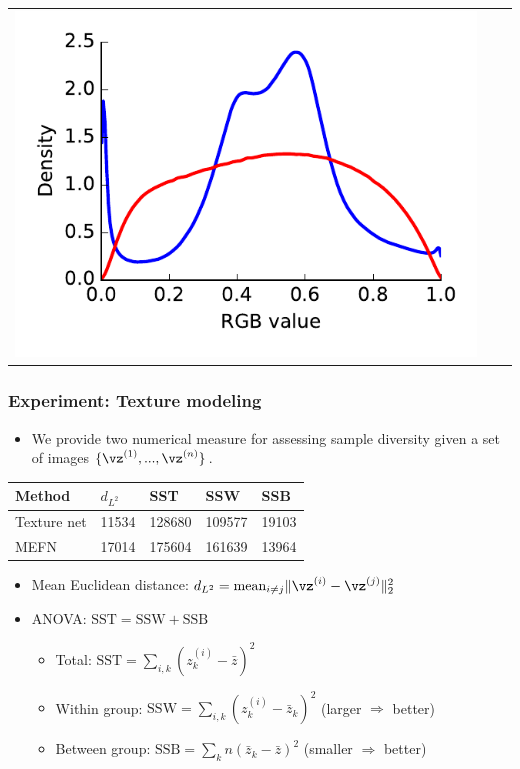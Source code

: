 \documentclass[16pt,presentation]{beamer}
\begin{document}
\begin{frame}
{\begin{tabular}[t]{ccc}
\hspace{-0.3cm}\includegraphics[scale=0.33,clip = true]{figs/MEFN/fig_texture_RGB_hist.pdf} \\
\end{tabular}
}
\end{frame}


\begin{frame}
\frametitle{Experiment: Texture modeling}
\begin{itemize}
\item We provide two numerical measure for assessing sample diversity given a set of images $\{\vz^{(1)},...,\vz^{(n)}\}$.
\end{itemize}
\centering
\begin{table}[htpb]
\begin{center}
\begin{tabular}{l | l | lll}
Method  & $d_{L^2}$& SST & SSW & SSB \\
\hline 
Texture net  & 11534 & 128680 & 109577 & 19103\\
MEFN   & 17014 & 175604 & 161639 & 13964 \\
\end{tabular}
\end{center}
\begin{itemize}
\item Mean Euclidean distance: $d_{L^2} = \text{mean}_{i \neq j} \|\vz^{(i)} - \vz^{(j)} \|_2^2$
\item ANOVA: $\text{SST} = \text{SSW} + \text{SSB}$
\begin{itemize}
\item Total: $\text{SST} = \sum_{i,k} (z_k^{(i)} - \bar{z})^2$
\item Within group: $\text{SSW} = \sum_{i,k} (z_k^{(i)} - \bar{z}_k)^2$ (larger $\Rightarrow$ better)
\item Between group: $\text{SSB} = \sum_{k} n (\bar{z}_k - \bar{z})^2$ (smaller $\Rightarrow$ better)
\end{itemize}
\end{itemize}
\label{tab:texture}
\end{table}
\end{frame}
\end{document}
